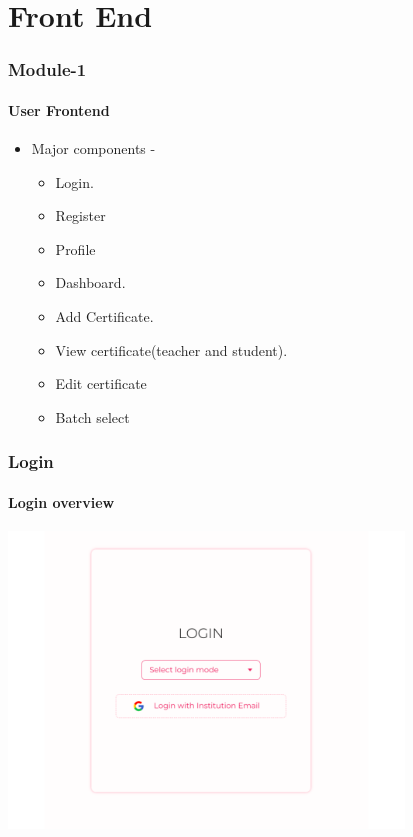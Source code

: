 \section{Front End}


\begin{frame}

 \frametitle{\centering Module-1}


  \framesubtitle{User Frontend}
  \begin{itemize}
    \item Major components -
    \begin{itemize} 
    \item Login.
    \item Register
    \item Profile
    \item Dashboard.
    \item Add Certificate.
    \item View certificate(teacher and student).
    \item Edit certificate
    \item Batch select
   \end{itemize}
 
  \end{itemize}
\end{frame}



\begin{frame}
  \frametitle{Login }
    \framesubtitle{Login overview}
\centering
{\includegraphics[width=10.5cm]{login1.png}}
\end{frame}

